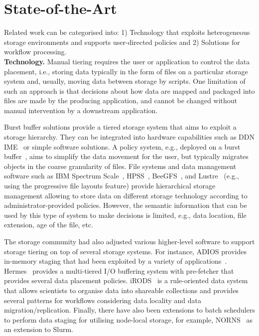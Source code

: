 \documentclass{superfri}
\begin{document}
\section{State-of-the-Art}
\label{sec:art}

Related work can be categorised into:
1) Technology that exploits heterogeneous storage environments and supports user-directed policies and
2) Solutions for workflow processing.\\

\textbf{Technology.}
Manual tiering requires the user or application to control the data placement, i.e., storing data typically in the form of files on a particular storage system and, usually, moving data between storage by scripts.
One limitation of such an approach is that decisions about how data are mapped and packaged into files are made by the producing application, and cannot be changed without manual intervention by a downstream application.

Burst buffer solutions provide a tiered storage system that aims to exploit a storage hierarchy.
They can be integrated into hardware capabilities such as DDN IME~\cite{BODIAIFSFI19} or simple software solutions.
A policy system, e.g., deployed on a burst buffer~\cite{RomanusRP15}, aims to simplify the data movement for the user, but typically migrates objects in the coarse granularity of files.
File systems and data management software such as IBM Spectrum Scale~\cite{SchmuckH02}, HPSS~\cite{528214}, BeeGFS~\cite{beegfs}, and Lustre~\cite{abs-1903-01955} (e.g., using the progressive file layouts feature) provide hierarchical storage management allowing to store data on different storage technology according to administrator-provided policies.
However, the semantic information that can be used by this type of system to make decisions is limited, e.g., data location, file extension, age of the file, etc.

The storage community had also adjusted various higher-level software to support storage tiering on top of several storage systems. For instance, ADIOS provides in-memory staging that had been exploited by a variety of applications~\cite{slawinska2013maya}.
Hermes~\cite{kougkas2020acceleration} provides a multi-tiered I/O buffering system with pre-fetcher that provides several data placement policies.
iRODS~\cite{rajasekar2010irods} is a rule-oriented data system that allows scientists to organise data into shareable collections and provides several patterns for workflows considering data locality and data migration/replication.
Finally, there have also been extensions to batch schedulers to perform data staging for utilising node-local storage, for example, NORNS~\cite{miranda2019norns} as an extension to Slurm.\\
\end{document}
